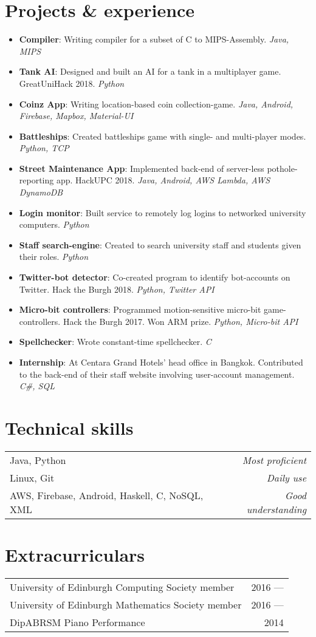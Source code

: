 \documentclass[11pt,a4paper]{article}
\begin{document}
\section*{Projects \& experience}
\begin{itemize}
    \item \textbf{Compiler}:
        Writing compiler for a subset of C to MIPS-Assembly.
        \textit{Java, MIPS}
    \item \textbf{Tank AI}:
        Designed and built an AI for a tank in a multiplayer game. GreatUniHack 2018.
        \textit{Python}
    \item \textbf{Coinz App}:
        Writing location-based coin collection-game.
		\textit{Java, Android, Firebase, Mapbox, Material-UI}
    \item \textbf{Battleships}:
        Created battleships game with single- and multi-player modes.
        \textit{Python, TCP}
    \item \textbf{Street Maintenance App}:
        Implemented back-end of server-less pothole-reporting app. HackUPC 2018.
		\textit{Java, Android, AWS Lambda, AWS DynamoDB}
    \item \textbf{Login monitor}:
        Built service to remotely log logins to networked university computers.
        \textit{Python}
    \item \textbf{Staff search-engine}:
        Created to search university staff and students given their roles.
        \textit{Python}
    \item \textbf{Twitter-bot detector}:
        Co-created program to identify bot-accounts on Twitter. Hack the Burgh 2018.
        \textit{Python, Twitter API}
    \item \textbf{Micro-bit controllers}:
        Programmed motion-sensitive micro-bit game-controllers. Hack the Burgh 2017.
        Won ARM prize.
        \textit{Python, Micro-bit API}
    \item \textbf{Spellchecker}:
        Wrote constant-time spellchecker.
        \textit{C}
    \item \textbf{Internship}:
        At Centara Grand Hotels' head office in Bangkok.
        Contributed to the back-end of their staff website involving user-account management.
        \textit{C\#, SQL} 
\end{itemize}

\hline
\section*{Technical skills}
\begin{tabularx}{\textwidth}{X r}
    Java, Python & \textit{Most proficient} \\
    Linux, Git & \textit{Daily use} \\
    AWS, Firebase, Android, Haskell, C, NoSQL, XML & \textit{Good understanding} \\
\end{tabularx}

\hline
\section*{Extracurriculars}
\begin{tabularx}{\textwidth}{X r}
    University of Edinburgh Computing Society member & 2016 --- \\
    University of Edinburgh Mathematics Society member & 2016 ---\\
    DipABRSM Piano Performance & 2014
\end{tabularx}
\end{document}
